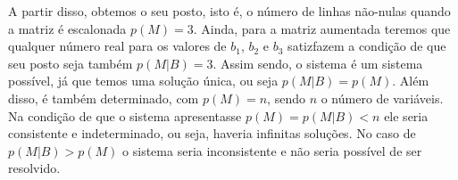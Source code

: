 A partir disso, obtemos o seu posto, isto é, o número de linhas não-nulas quando a matriz é escalonada $p(M) = 3$. Ainda, para a matriz aumentada teremos que qualquer número real para os valores de $b_1$, $b_2$ e $b_3$ satizfazem a condição de que seu posto seja também $p(M|B) = 3$. Assim sendo, o sistema é um sistema possível, já que temos uma solução única, ou seja $p(M|B) = p(M)$. Além disso, é também determinado, com $p(M)=n$, sendo $n$ o número de variáveis. Na condição de que o sistema apresentasse $p(M)=p(M|B)<n$ ele seria consistente e indeterminado, ou seja, haveria infinitas soluções. No caso de $p(M|B)>p(M)$ o sistema seria inconsistente e não seria possível de ser resolvido.